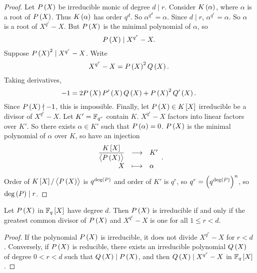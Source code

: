 \begin{proof}
Let $ P\br{X} $ be irreducible monic of degree $ d \mid r $. Consider $ K\br{\alpha} $, where $ \alpha $ is a root of $ P\br{X} $. Thus $ K\br{\alpha} $ has order $ q^d $. So $ \alpha^{q^d} = \alpha $. Since $ d \mid r $, $ \alpha^{q^r} = \alpha $. So $ \alpha $ is a root of $ X^{q^r} - X $. But $ P\br{X} $ is the minimal polynomial of $ \alpha $, so
$$ P\br{X} \mid X^{q^r} - X. $$
Suppose $ P\br{X}^2 \mid X^{q^r} - X $. Write
$$ X^{q^r} - X = P\br{X}^2Q\br{X}. $$
Taking derivatives,
$$ -1 = 2P\br{X}P'\br{X}Q\br{X} + P\br{X}^2Q'\br{X}. $$
Since $ P\br{X} \nmid -1 $, this is impossible. Finally, let $ P\br{X} \in K\sbr{X} $ irreducible be a divisor of $ X^{q^r} - X $. Let $ K' = \mathbb{F}_{q^r} $ contain $ K $. $ X^{q^r} - X $ factors into linear factors over $ K' $. So there exists $ \alpha \in K' $ such that $ P\br{\alpha} = 0 $. $ P\br{X} $ is the minimal polynomial of $ \alpha $ over $ K $, so have an injection
$$ \function{\dfrac{K\sbr{X}}{\abr{P\br{X}}}}{K'}{X}{\alpha}. $$
Order of $ K\sbr{X} / \abr{P\br{X}} $ is $ q^{\deg\br{P}} $ and order of $ K' $ is $ q^r $, so $ q^r = \br{q^{\deg\br{P}}}^n $, so $ \deg\br{P} \mid r $.
\end{proof}

\begin{corollary}
Let $ P\br{X} $ in $ \F_q\sbr{X} $ have degree $ d $. Then $ P\br{X} $ is irreducible if and only if the greatest common divisor of $ P\br{X} $ and $ X^{q^r} - X $ is one for all $ 1 \le r < d $.
\end{corollary}

\begin{proof}
If the polynomial $ P\br{X} $ is irreducible, it does not divide $ X^{q^r} - X $ for $ r < d $. Conversely, if $ P\br{X} $ is reducible, there exists an irreducible polynomial $ Q\br{X} $ of degree $ 0 < r < d $ such that $ Q\br{X} \mid P\br{X} $, and then $ Q\br{X} \mid X^{q^r} - X $ in $ \F_q\sbr{X} $.
\end{proof}

